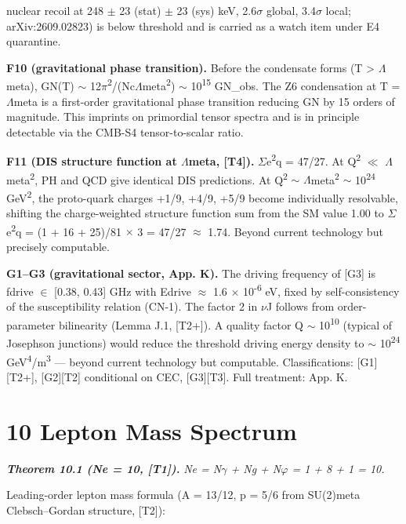 \documentclass[11pt,letterpaper]{article}
\begin{document}
nuclear recoil at 248 $\pm$ 23 (stat) $\pm$ 23 (sys) keV, 2.6$\sigma$ global, 3.4$\sigma$ local; arXiv:2609.02823) is below threshold and is carried as a watch item under E4 quarantine.

\noindent \textbf{F10 (gravitational phase transition). }Before the condensate forms (T > $\Lambda$meta), GN(T) $\sim$ 12$\pi$\textsuperscript{2}/(Nc$\Lambda$meta\textsuperscript{2}) $\sim$ 10\textsuperscript{15} GN\_obs. The Z6 condensation at T = $\Lambda$meta is a first-order gravitational phase transition reducing GN by 15 orders of magnitude. This imprints on primordial tensor spectra and is in principle detectable via the CMB-S4 tensor-to-scalar ratio.

\noindent \textbf{F11 (DIS structure function at $\Lambda$meta, [T4]). }$\Sigma$e\textsuperscript{2}q = 47/27. At Q\textsuperscript{2} $\ll$ $\Lambda$meta\textsuperscript{2}, PH and QCD give identical DIS predictions. At Q\textsuperscript{2} $\sim$ $\Lambda$meta\textsuperscript{2} $\sim$ 10\textsuperscript{24} GeV\textsuperscript{2}, the proto-quark charges +1/9, +4/9, +5/9 become individually resolvable, shifting the charge-weighted structure function sum from the SM value 1.00 to $\Sigma$e\textsuperscript{2}q = (1 + 16 + 25)/81 $\times$ 3 = 47/27 $\approx$ 1.74. Beyond current technology but precisely computable.

\noindent \textbf{G1--G3 (gravitational sector, App. K). }The driving frequency of [G3] is fdrive $\in$ [0.38, 0.43] GHz with Edrive $\approx$ 1.6 $\times$ 10\textsuperscript{-6} eV, fixed by self-consistency of the susceptibility relation (CN-1). The factor 2 in $\nu$J follows from order-parameter bilinearity (Lemma J.1, [T2+]). A quality factor Q $\sim$ 10\textsuperscript{10} (typical of Josephson junctions) would reduce the threshold driving energy density to $\sim$ 10\textsuperscript{24} GeV\textsuperscript{4}/m\textsuperscript{3} --- beyond current technology but computable. Classifications: [G1][T2+], [G2][T2] conditional on CEC, [G3][T3]. Full treatment: App. K.

\section*{10  Lepton Mass Spectrum}

\noindent \textbf{\textit{Theorem 10.1 (Ne = 10, [T1]). }}\textit{Ne = N$\gamma$ + Ng + N$\varphi$ = 1 + 8 + 1 = 10.}

\noindent Leading-order lepton mass formula (A = 13/12, p = 5/6 from SU(2)meta Clebsch--Gordan structure, [T2]):
\end{document}
